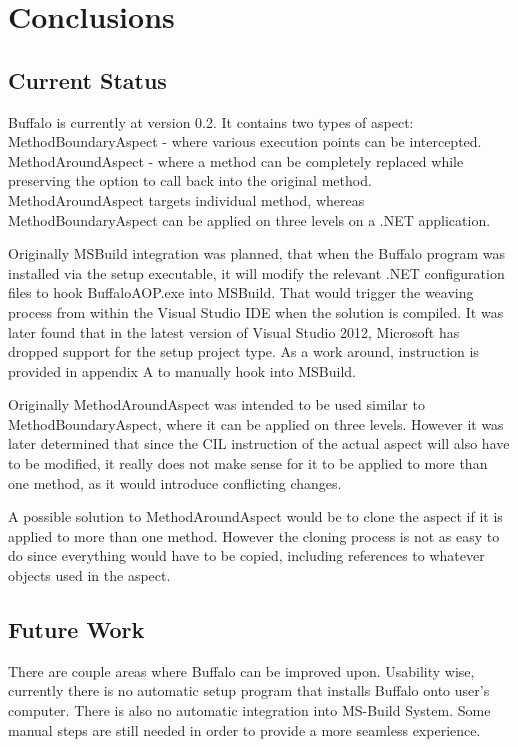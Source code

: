 \chapter{Conclusions}
\section{Current Status}

Buffalo is currently at version 0.2. It contains two types of aspect:  MethodBoundaryAspect - where various execution points can be intercepted. MethodAroundAspect - where a method can be completely replaced while preserving the option to call back into the original method. MethodAroundAspect targets individual method, whereas MethodBoundaryAspect can be applied on three levels on a .NET application.

Originally MSBuild integration was planned, that when the Buffalo program was installed via the setup executable, it will modify the relevant .NET configuration files to hook BuffaloAOP.exe into MSBuild. That would trigger the weaving process from within the Visual Studio IDE when the solution is compiled. It was later found that in the latest version of Visual Studio 2012, Microsoft has dropped support for the setup project type. As a work around, instruction is provided in appendix A to manually hook into MSBuild.

Originally MethodAroundAspect was intended to be used similar to MethodBoundaryAspect, where it can be applied on three levels. However it was later determined that since the CIL instruction of the actual aspect will also have to be modified, it really does not make sense for it to be applied to more than one method, as it would introduce conflicting changes.

A possible solution to MethodAroundAspect would be to clone the aspect if it is applied to more than one method. However the cloning process is not as easy to do since everything would have to be copied, including references to whatever objects used in the aspect.

\section{Future Work}

There are couple areas where Buffalo can be improved upon. Usability wise, currently there is no automatic setup program that installs Buffalo onto user’s computer. There is also no automatic integration into MS-Build System. Some manual steps are still needed in order to provide a more seamless experience.

